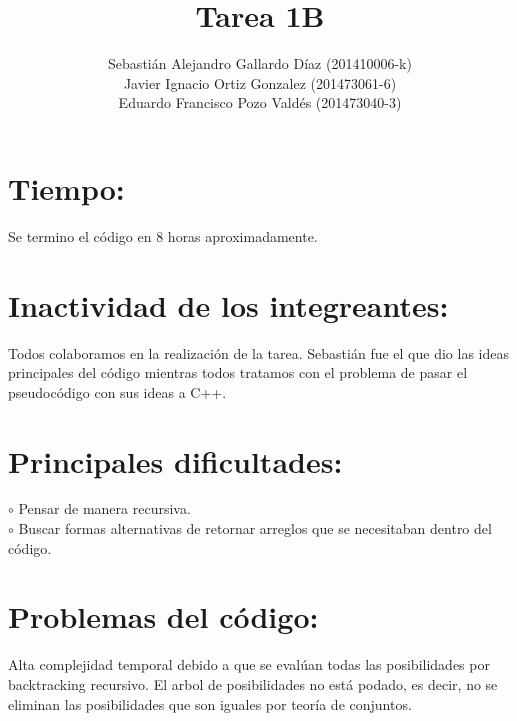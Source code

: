 \documentclass[11pt,letterpaper]{article}
\title{Tarea 1B}
\author{Sebasti\'an Alejandro Gallardo D\'iaz (201410006-k)\\Javier Ignacio Ortiz Gonzalez (201473061-6)\\Eduardo Francisco Pozo Vald\'es (201473040-3)}
\begin{document}
\begin{titlepage}
\maketitle
\end{titlepage}
\section{Tiempo:}Se termino el c\'odigo en 8 horas aproximadamente.
\section{Inactividad de los integreantes:}Todos colaboramos en la realizaci\'on de la tarea. Sebasti\'an fue el que dio las ideas principales del c\'odigo mientras todos tratamos con el problema de pasar el pseudoc\'odigo con sus ideas a C++.
\section{Principales dificultades:}
$\circ$ Pensar de manera recursiva.\\
$\circ$ Buscar formas alternativas de retornar arreglos que se necesitaban dentro del c\'odigo.
\section{Problemas del c\'odigo:}
Alta complejidad temporal debido a que se eval\'uan todas las posibilidades por backtracking recursivo. El arbol de posibilidades no est\'a podado, es decir, no se eliminan las posibilidades que son iguales por teor\'ia de conjuntos. 
\end{document}
